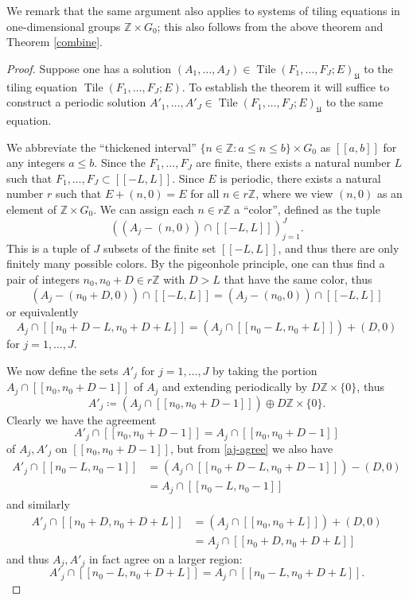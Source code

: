 \documentclass[reqno,a4paper,12pt]{amsart}
\numberwithin{equation}{section}
\numberwithin{figure}{section}
\def\Z{\mathbb{Z}}
\renewcommand\leq{\leqslant}
\newcommand{\Tile}{\operatorname{Tile}}
\newcommand{\Universe}{{\mathfrak{U}}}
\theoremstyle{plain}
\theoremstyle{definition}
\begin{document}
We remark that the same argument also applies to systems of tiling equations in one-dimensional groups $\Z \times G_0$; this also follows from the above theorem and Theorem \ref{combine}.

\begin{proof}  Suppose one has a solution $(A_1,\dots,A_J) \in \Tile(F_1,\dots,F_J; E)_\Universe$ to the tiling equation $\Tile(F_1,\dots,F_J; E)$.
To establish the theorem it will suffice to construct a periodic solution $A'_1,\dots,A'_J  \in \Tile(F_1,\dots,F_J; E)_\Universe$ to the same equation.

We abbreviate the ``thickened interval'' $\{ n \in \Z: a \leq n \leq b\} \times G_0$ as $[[a,b]]$ for any integers $a \leq b$.
Since the $F_1,\dots,F_J$ are finite, there exists a natural number $L$ such that $F_1,\dots,F_J \subset [[-L,L]]$.  Since $E$ is periodic, there exists a natural number $r$ such that $E + (n,0) = E$ for all $n \in r\Z$, where we view $(n,0)$ as an element of $\Z \times G_0$.  We can assign each $n \in r\Z$ a ``color'', defined as the tuple
$$ \left( (A_j - (n,0)) \cap [[-L,L]] \right)_{j=1}^J.$$
This is a tuple of $J$ subsets of the finite set $[[-L,L]]$, and thus there are only finitely many possible colors.  By the pigeonhole principle, one can thus find a pair of integers $n_0, n_0+D \in r\Z$ with $D>L$ that have the same color, thus
$$ (A_j - (n_0+D,0)) \cap [[-L,L]] = (A_j - (n_0,0) ) \cap [[-L,L]]$$
or equivalently
\begin{equation}\label{aj-agree}
 A_j \cap [[n_0+D-L,n_0+D+L]] = \left(  A_j \cap [[n_0-L,n_0+L]] \right) + (D,0)
 \end{equation}
 for $j=1,\dots,J$.  

We now define the sets $A'_j$ for $j=1,\dots,J$ by taking the portion $A_j \cap [[n_0,n_0+D-1]]$ of $A_j$ and extending periodically by $D\Z \times \{0\}$, thus
$$ A'_j \coloneqq ( A_j \cap [[n_0,n_0+D-1]]) \oplus D\Z \times \{0\}.$$
Clearly we have the agreement
$$ A'_j \cap [[n_0, n_0+D-1]] = A_j \cap [[n_0, n_0 + D-1]]$$
of $A_j, A'_j$ on $[[n_0,n_0+D-1]]$, but from \eqref{aj-agree} we also have
\begin{align*}
A'_j \cap [[n_0-L,n_0-1]] &= (A_j \cap [[n_0+D-L, n_0+D-1]]) - (D,0) \\
&=A_j \cap [[n_0-L, n_0-1]]
\end{align*}
and similarly
\begin{align*}
A'_j \cap [[n_0+D, n_0+D+L]] &= (A_j \cap [[n_0, n_0+L]]) + (D,0) \\
&= A_j \cap [[n_0+D, n_0+D+L]]
\end{align*}
and thus $A_j, A'_j$ in fact agree on a larger region:
\begin{equation}\label{aj-ajp-agree}
A'_j \cap [[n_0-L, n_0+D+L]] = A_j \cap [[n_0-L, n_0+D+L]].
\end{equation}



\end{proof}
\end{document}

